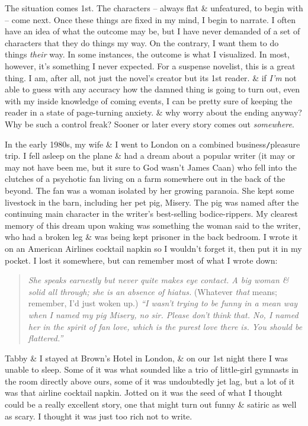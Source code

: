 \documentclass{article}
\numberwithin{equation}{section}
\begin{document}
The situation comes 1st. The characters -- always flat \& unfeatured, to begin with -- come next. Once these things are fixed in my mind, I begin to narrate. I often have an idea of what the outcome may be, but I have never demanded of a set of characters that they do things my way. On the contrary, I want them to do things \textit{their} way. In some instances, the outcome is what I visualized. In most, however, it's something I never expected. For a suspense novelist, this is a great thing. I am, after all, not just the novel's creator but its 1st reader. \& if \textit{I'm} not able to guess with any accuracy how the damned thing is going to turn out, even with my inside knowledge of coming events, I can be pretty sure of keeping the reader in a state of page-turning anxiety. \& why worry about the ending anyway? Why be such a control freak? Sooner or later every story comes out \textit{somewhere}.

In the early 1980s, my wife \& I went to London on a combined business{\tt/}pleasure trip. I fell asleep on the plane \& had a dream about a popular writer (it may or may not have been me, but it sure to God wasn't James Caan) who fell into the clutches of a psychotic fan living on a farm somewhere out in the back of the beyond. The fan was a woman isolated by her growing paranoia. She kept some livestock in the barn, including her pet pig, Misery. The pig was named after the continuing main character in the writer's best-selling bodice-rippers. My clearest memory of this dream upon waking was something the woman said to the writer, who had a broken leg \& was being kept prisoner in the back bedroom. I wrote it on an American Airlines cocktail napkin so I wouldn't forget it, then put it in my pocket. I lost it somewhere, but can remember most of what I wrote down:
\begin{quotation}
	\textit{She speaks earnestly but never quite makes eye contact. A big woman \& solid all through; she is an absence of hiatus.} (Whatever \textit{that} means; remember, I'd just woken up.) \textit{``I wasn't trying to be funny in a mean way when I named my pig Misery, no sir. Please don't think that. No, I named her in the spirit of fan love, which is the purest love there is. You should be flattered.''}
\end{quotation}
Tabby \& I stayed at Brown's Hotel in London, \& on our 1st night there I was unable to sleep. Some of it was what sounded like a trio of little-girl gymnasts in the room directly above ours, some of it was undoubtedly jet lag, but a lot of it was that airline cocktail napkin. Jotted on it was the seed of what I thought could be a really excellent story, one that might turn out funny \& satiric as well as scary. I thought it was just too rich not to write.
\end{document}
